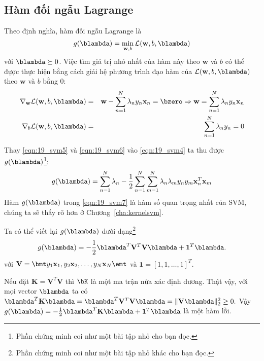 \subsection{Hàm đối ngẫu Lagrange}
Theo định nghĩa, hàm đối ngẫu Lagrange là 
\begin{equation*} 
g(\blambda) = \min_{\mathbf{w}, b} \mathcal{L}(\mathbf{w}, b, \blambda)  
\end{equation*} 
với $\blambda \succeq 0$. Việc tìm giá trị nhỏ nhất của hàm này theo $\mathbf{w}$
và $b$ có thể đựợc thực hiện bằng cách giải hệ phương trình đạo hàm của $\mathcal{L}(\mathbf{w}, b, \blambda)$ theo $\mathbf{w}$ và $b$ bằng 0:
\begin{eqnarray} 
\label{eqn:19_svm5}
\nabla_{\mathbf{w}}\mathcal{L}(\mathbf{w}, b, \blambda) &=&
\mathbf{w} - \sum_{n=1}^N \lambda_n y_n \mathbf{x}_n = \bzero \Rightarrow
\mathbf{w} = \sum_{n=1}^N \lambda_n y_n \mathbf{x}_n \\\ 
\label{eqn:19_svm6}
\nabla_{b}\mathcal{L}(\mathbf{w}, b, \blambda) &=&  
\sum_{n=1}^N \lambda_ny_n = 0 
\end{eqnarray} 
 
Thay \eqref{eqn:19_svm5} và \eqref{eqn:19_svm6} vào \eqref{eqn:19_svm4} ta thu
được $g(\blambda)$\footnote{Phần chứng minh coi như một bài tập nhỏ cho bạn
đọc.}:
\begin{equation} 
\label{eqn:19_svm7}
g(\blambda) = \sum_{n=1}^N \lambda_n  -\frac{1}{2}\sum_{n=1}^N \sum_{m=1}^N \lambda_n\lambda_m y_n y_m \mathbf{x}_n^T\mathbf{x}_m
\end{equation} 
Hàm $g(\blambda)$ trong \eqref{eqn:19_svm7} {là hàm số quan trọng nhất
của SVM}, chúng ta sẽ thấy rõ hơn ở Chương~\ref{cha:kernelsvm}.


Ta có thể viết lại $g(\blambda)$
dưới dạng\footnote{Phần chứng minh coi như một bài tập nhỏ khác cho bạn đọc.}
\begin{equation} 
\label{eqn:19_svm8}
g(\blambda) = -\frac{1}{2}\blambda^T\mathbf{V}^T\mathbf{V}\mathbf{\blambda} + \mathbf{1}^T\blambda.
\end{equation} 
với 
\begin{math} 
    \mathbf{V} = \bmt y_1 \mathbf{x}_1, y_2 \mathbf{x}_2, \dots, y_N \mathbf{x}_N \emt 
\end{math} 
và $\mathbf{1} = [1, 1, \dots, 1]^T$.

Nếu đặt $\mathbf{K} = \mathbf{V}^T\mathbf{V}$ thì $\bK$ là một ma trận nửa xác
định dương. Thật vậy, với mọi vector $\blambda$ ta có $\blambda^T\mathbf{K}\mathbf{\blambda} = \blambda^T\mathbf{V}^T\mathbf{V}\mathbf{\blambda} = \|\mathbf{V}\blambda\|_2^2 \geq 0.$
Vậy $g(\blambda) = -\frac{1}{2}\blambda^T\mathbf{K}\mathbf{\blambda} + \mathbf{1}^T\blambda$ là một hàm lồi. 
 
